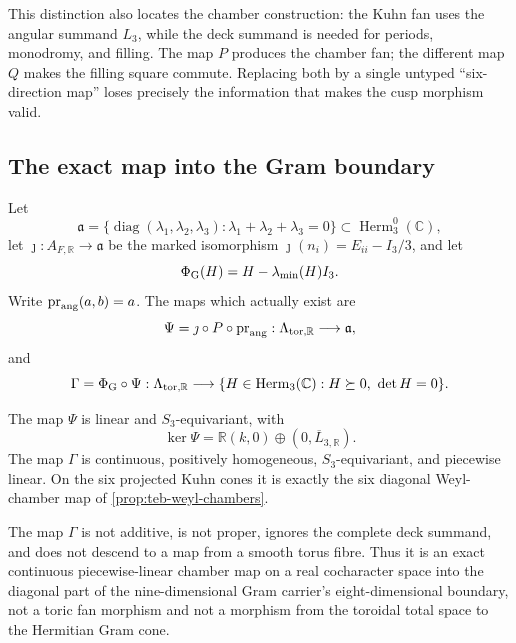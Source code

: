 This distinction also locates the chamber construction: the Kuhn fan uses the
angular summand \(L_3\), while the deck summand is needed for periods,
monodromy, and filling.  The map \(P\) produces the chamber fan; the different
map \(Q\) makes the filling square commute.  Replacing both by a single
untyped ``six-direction map'' loses precisely the information that makes the
cusp morphism valid.

\subsection{The exact map into the Gram boundary}
\label{rsl:subsec:gram-map}

Let
\[
 \mathfrak a
 =\{\operatorname{diag}(\lambda_1,\lambda_2,\lambda_3):
       \lambda_1+\lambda_2+\lambda_3=0\}
 \subset\operatorname{Herm}_3^0(\mathbb C),
\]
let \(\jmath:A_{F,\mathbb R}\to\mathfrak a\) be the marked isomorphism
\(\jmath(n_i)=E_{ii}-I_3/3\), and let
\[
 \Phi_{\rm G}(H)=H-\lambda_{\min}(H)I_3.
\]
Write \(\operatorname{pr}_{\rm ang}(a,b)=a\).  The maps which actually exist
are
\begin{equation}
 \Psi=\jmath\circ P\circ\operatorname{pr}_{\rm ang}:
 \Lambda_{\rm tor,\mathbb R}\longrightarrow\mathfrak a,
 \label{rsl:eq:linear-gram-map}
\end{equation}
and
\begin{equation}
 \Gamma=\Phi_{\rm G}\circ\Psi:
 \Lambda_{\rm tor,\mathbb R}\longrightarrow
 \{H\in\operatorname{Herm}_3(\mathbb C):H\succeq0,\ \det H=0\}.
 \label{rsl:eq:piecewise-gram-map}
\end{equation}

\begin{proposition}
\label{rsl:prop:gram-scope}
The map \(\Psi\) is linear and \(S_3\)-equivariant, with
\begin{equation}
 \ker\Psi=\mathbb R(k,0)\oplus(0,\overline L_{3,\mathbb R}).
 \label{rsl:eq:psi-kernel}
\end{equation}
The map \(\Gamma\) is continuous, positively homogeneous,
\(S_3\)-equivariant, and piecewise linear.  On the six projected Kuhn cones it
is exactly the six diagonal Weyl-chamber map of
\cref{prop:teb-weyl-chambers}.

The map \(\Gamma\) is not additive, is not proper, ignores the complete deck
summand, and does not descend to a map from a smooth torus fibre.  Thus it is
an exact continuous piecewise-linear chamber map on a real cocharacter space
into the diagonal part of the nine-dimensional Gram carrier's
eight-dimensional boundary, not a toric fan morphism and not a morphism from
the toroidal total space to the Hermitian Gram cone.
\end{proposition}

